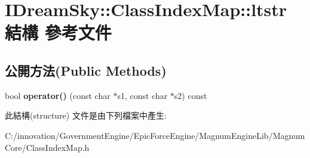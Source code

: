 \hypertarget{struct_i_dream_sky_1_1_class_index_map_1_1ltstr}{}\section{I\+Dream\+Sky\+:\+:Class\+Index\+Map\+:\+:ltstr 結構 參考文件}
\label{struct_i_dream_sky_1_1_class_index_map_1_1ltstr}
\subsection*{公開方法(Public Methods)}
\begin{DoxyCompactItemize}
\item 
bool {\bfseries operator()} (const char $\ast$s1, const char $\ast$s2) const \hypertarget{struct_i_dream_sky_1_1_class_index_map_1_1ltstr_a61bfe766509bbf6e156f50fcc332e1f1}{}\label{struct_i_dream_sky_1_1_class_index_map_1_1ltstr_a61bfe766509bbf6e156f50fcc332e1f1}

\end{DoxyCompactItemize}


此結構(structure) 文件是由下列檔案中產生\+:\begin{DoxyCompactItemize}
\item 
C\+:/innovation/\+Government\+Engine/\+Epic\+Force\+Engine/\+Magnum\+Engine\+Lib/\+Magnum\+Core/Class\+Index\+Map.\+h\end{DoxyCompactItemize}
